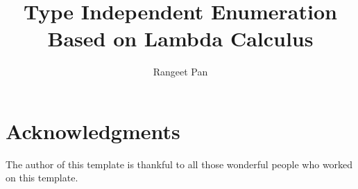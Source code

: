 \documentclass{llncs}
\begin{document}
\title{Type Independent Enumeration Based on Lambda Calculus}

\author{Rangeet Pan}
%



\maketitle

\begin{abstract}

\end{abstract}

 


 
%
%
%
\section{Acknowledgments}

The author of this template is thankful to all those 
wonderful people who worked on this template. 


  
\end{document}
